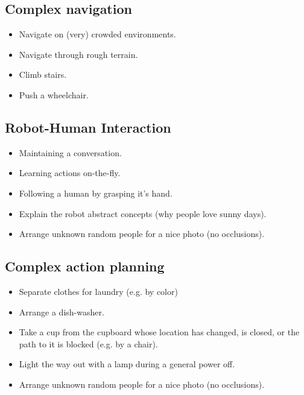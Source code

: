 \subsection{Complex navigation}
\begin{itemize}
	\item Navigate on (very) crowded environments.
	\item Navigate through rough terrain.
	\item Climb stairs.
	\item Push a wheelchair.
\end{itemize}

\subsection{Robot-Human Interaction}
\begin{itemize}
	\item Maintaining a conversation.
	\item Learning actions on-the-fly.
	\item Following a human by grasping it's hand.
	\item Explain the robot abstract concepts (why people love sunny days).
	\item Arrange unknown random people for a nice photo (no occlusions).
\end{itemize}

\subsection{Complex action planning} 
\begin{itemize}
	\item Separate clothes for laundry (e.g. by color)
	\item Arrange a dish-washer.
	\item Take a cup from the cupboard whose location has changed, is closed, or the path to it is blocked (e.g. by a chair).
	\item Light the way out with a lamp during a general power off.
	\item Arrange unknown random people for a nice photo (no occlusions).
\end{itemize}
